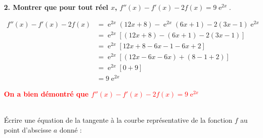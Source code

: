 \documentclass[11pt,a4paper]{article}
\DeclareMathOperator{\e}{e}
\begin{document}
\textbf{2. Montrer que pour tout réel $x$, $f''(x) - f'(x) - 2f(x) = 9\e^{2x}.$}

\begin{tcolorbox}[colback=red!5!white,colframe=red!75!black]
{
\[
\begin{aligned}
f''(x) - f'(x) - 2f(x) &= \e^{2x}(12x+8) - \e^{2x}(6x+1) - 2(3x-1)\e^{2x} \\
&= \e^{2x}[(12x+8) - (6x+1) - 2(3x-1)] \\
&= \e^{2x}[12x + 8 - 6x - 1 - 6x + 2] \\
&= \e^{2x}[(12x - 6x - 6x) + (8 - 1 + 2)] \\
&= \e^{2x}[0 + 9] \\
&= 9\e^{2x}
\end{aligned}
\]

\vspace{2mm}

\begin{center}
\textbf{\textcolor{red}{On a bien démontré que $f''(x) - f'(x) - 2f(x) = 9\e^{2x}$}}
\end{center}
}
\end{tcolorbox}

\\

Écrire une équation de la tangente à la courbe représentative de la fonction $f$ au point d'abscisse $a$ donné : 
\end{document}
